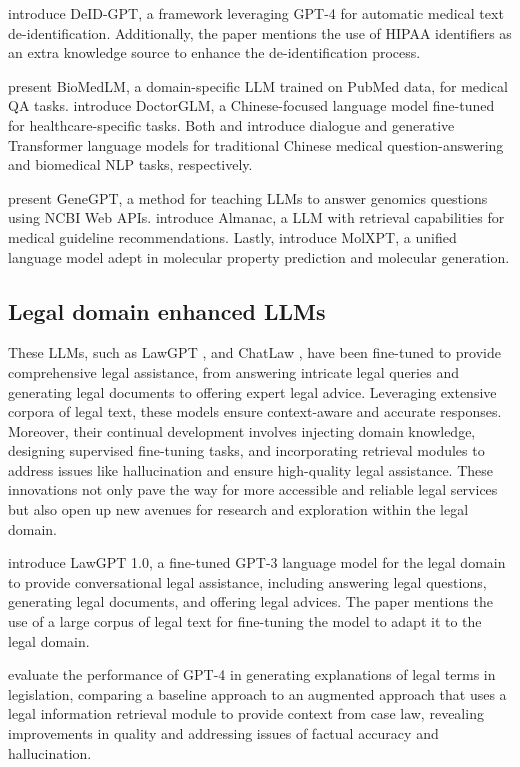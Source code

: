 \citet{liu2023deid} introduce DeID-GPT, a framework leveraging GPT-4 for automatic medical text de-identification. Additionally, the paper mentions the use of HIPAA identifiers as an extra knowledge source to enhance the de-identification process.

\citet{venigalla2022biomedlm} present BioMedLM, a domain-specific LLM trained on PubMed data, for medical QA tasks. \citet{xiong2023doctorglm} introduce DoctorGLM, a Chinese-focused language model fine-tuned for healthcare-specific tasks. Both \citet{tan2023medchatzh} and \citet{luo2022biogpt} introduce dialogue and generative Transformer language models for traditional Chinese medical question-answering and biomedical NLP tasks, respectively.

\citet{jin2023genegpt} present GeneGPT, a method for teaching LLMs to answer genomics questions using NCBI Web APIs. 
\citet{hiesinger2023almanac} introduce Almanac, a LLM with retrieval capabilities for medical guideline recommendations. Lastly, \citet{liu2023molxpt} introduce MolXPT, a unified language model adept in molecular property prediction and molecular generation.

\subsection{Legal domain enhanced LLMs} These LLMs, such as LawGPT \citep{nguyen2023brief}, and ChatLaw \citep{ChatLaw}, have been fine-tuned to provide comprehensive legal assistance, from answering intricate legal queries and generating legal documents to offering expert legal advice. Leveraging extensive corpora of legal text, these models ensure context-aware and accurate responses. Moreover, their continual development involves injecting domain knowledge, designing supervised fine-tuning tasks, and incorporating retrieval modules to address issues like hallucination and ensure high-quality legal assistance. These innovations not only pave the way for more accessible and reliable legal services but also open up new avenues for research and exploration within the legal domain.


\citet{nguyen2023brief} 
introduce LawGPT 1.0, a fine-tuned GPT-3 language model for the legal domain to provide conversational legal assistance, including answering legal questions, generating legal documents, and offering legal advices.
 The paper mentions the use of a large corpus of legal text for fine-tuning the model to adapt it to the legal domain.

\citet{savelka2023explaining}
 evaluate the performance of GPT-4 in generating explanations of legal terms in legislation, comparing a baseline approach to an augmented approach that uses a legal information retrieval module to provide context from case law, revealing improvements in quality and addressing issues of factual accuracy and hallucination.


